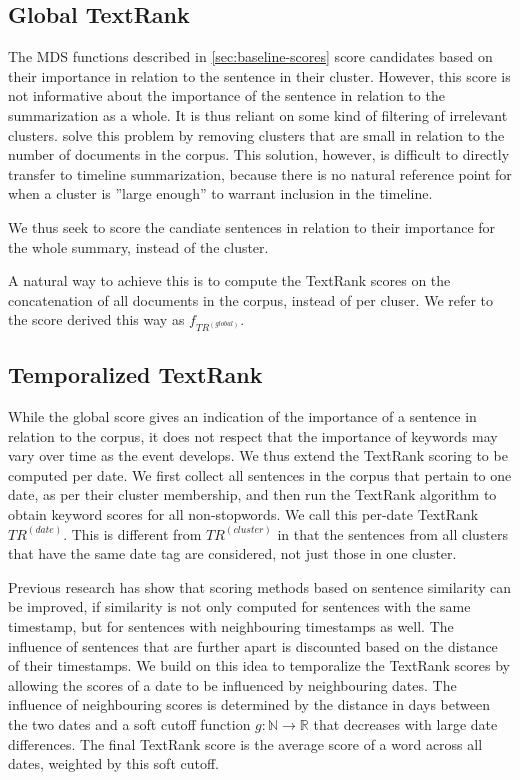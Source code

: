 \documentclass[a4paper,BCOR=10mm]{report}
\numberwithin{lemma}{chapter}
\numberwithin{definition}{chapter}
\begin{document}
\subsection{Global TextRank}

The MDS functions described in \ref{sec:baseline-scores} score candidates based on their importance in relation to the sentence in their cluster.
However, this score is not informative about the importance of the sentence in relation to the summarization as a whole.
It is thus reliant on some kind of filtering of irrelevant clusters. \citet{banerjee} solve this problem by removing clusters that are small in relation to the number of documents in the corpus. This solution, however, is difficult to directly transfer to timeline summarization, because there is no natural reference point for when a cluster is ''large enough'' to warrant inclusion in the timeline.

We thus seek to score the candiate sentences in relation to their importance for the whole summary, instead of the cluster.

A natural way to achieve this is to compute the TextRank \citep{textrank} scores on the concatenation of all documents in the corpus, instead of per cluser.
We refer to the score derived this way as $f_{TR^{(global)}}$.

\subsection{Temporalized TextRank}

While the global score gives an indication of the importance of a sentence in relation to the corpus, it does not respect that the importance of keywords may vary over time as the event develops.
We thus extend the TextRank scoring to be computed per date. We first collect all sentences in the corpus that pertain to one date, as per their cluster membership, and then run the TextRank algorithm to obtain keyword scores for all non-stopwords. We call this per-date TextRank $TR^{(date)}$.
This is different from $TR^{(cluster)}$ in that the sentences from all clusters that have the same date tag are considered, not just those in one cluster.

Previous research \citep{yan-trans, markert} has show that scoring methods based on sentence similarity can be improved, if similarity is not only computed for sentences with the same timestamp, but for sentences with neighbouring timestamps as well. The influence of sentences that are further apart is discounted based on the distance of their timestamps.
We build on this idea to temporalize the TextRank scores by allowing the scores of a date to be influenced by neighbouring dates. The influence of neighbouring scores is determined by the distance in days between the two dates and a soft cutoff function $g: \mathbb{N} \rightarrow \mathbb{R}$ that decreases with large date differences.
The final TextRank score is the average score of a word across all dates, weighted by this soft cutoff.
\end{document}
